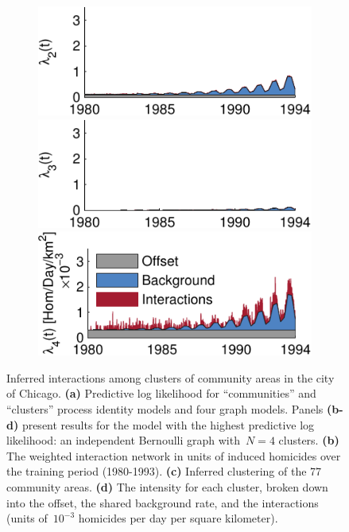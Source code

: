 \begin{figure}[!t]
\begin{center}
\begin{subfigure}[B]{.28\textwidth}
      \includegraphics[width=\linewidth]{figures/ch3/icpsr_rate2} \\ 
      \includegraphics[width=\linewidth]{figures/ch3/icpsr_rate3} \\
      \includegraphics[width=\linewidth]{figures/ch3/icpsr_rate4} 
      \label{fig:chicago_rates}
    \end{subfigure}
  \end{center}
\vspace{-1em}
\caption[Inferred gang interactions in the city of Chicago]{
  Inferred interactions among clusters of community areas in the city of Chicago.
  \textbf{(a)} Predictive log likelihood for ``communities'' and ``clusters''  process identity models and four graph models. 
  Panels \textbf{(b-d)} present results for the model with the highest predictive log likelihood: an independent Bernoulli graph with~${N=4}$ clusters.
  \textbf{(b)} The weighted interaction network in units of induced homicides over the training period (1980-1993).
  \textbf{(c)} Inferred clustering of the 77 community areas.
  \textbf{(d)} The intensity for each cluster, broken down into the offset, the shared background rate, and the interactions (units of~${10^{-3}}$ homicides per day per square kilometer).}
\label{fig:chicago}
\end{figure}



